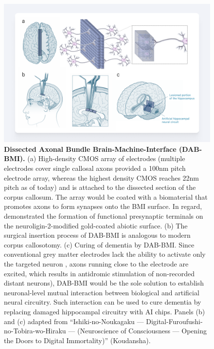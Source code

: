\documentclass[10pt]{article}
\begin{document}
\begin{sloppypar}
  \begin{figure}[ht!]
    \centering
    \includegraphics[width=\textwidth]{figures/masa-approach-1.png}
    \caption[CHI: Dissected Axonal Bundle Brain-Machine-Interface]{\textbf{Dissected Axonal Bundle Brain-Machine-Interface (DAB-BMI).} (a) High-density CMOS array of electrodes (multiple electrodes cover single callosal axons provided a 100nm pitch electrode array, whereas the highest density CMOS reaches 22nm pitch as of today) and is attached to the dissected section of the corpus callosum. The array would be coated with a biomaterial that promotes axons to form synapses onto the BMI surface. In regard, \cite{cho2024site} demonstrated the formation of functional presynaptic terminals on the neuroligin-2-modified gold-coated abiotic surface. (b) The surgical insertion process of DAB-BMI is analogous to modern corpus callosotomy. (c) Curing of dementia by DAB-BMI. Since conventional grey matter electrodes lack the ability to activate only the targeted neuron \citep{histed2009direct}, axons running close to the electrode are excited, which results in antidromic stimulation of non-recorded distant neurons), DAB-BMI would be the sole solution to establish neuronal-level mutual interaction between biological and artificial neural circuitry. Such interaction can be used to cure dementia by replacing damaged hippocampal circuitry with AI chips. Panels (b) and (c) adapted from “Ishiki-no-Noukagaku — Digital-Furoufushi-no-Tobira-wo-Hiraku — (Neuroscience of Consciousness — Opening the Doors to Digital Immortality)” (Koudansha).}
    \label{fig:masa-approach-1}
  \end{figure}


\end{sloppypar}
\end{document}
